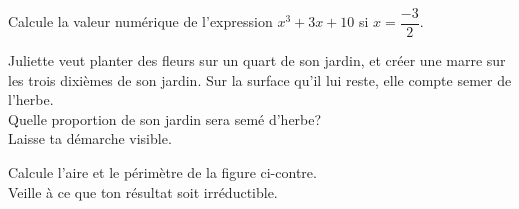 \documentclass[../math2.tex]{subfiles}
\begin{document}
\begin{exercise}
  Calcule la valeur numérique de l'expression $x^3+3x+10$ si $x=\dfrac{-3}{2}$.
\end{exercise}

\begin{exercise}
  Juliette veut planter des fleurs sur un quart de son jardin, et créer une marre sur les trois dixièmes de son jardin. Sur la surface qu'il lui reste, elle compte semer de l'herbe. \\
  Quelle proportion de son jardin sera semé d'herbe?  \\ Laisse ta démarche visible.
\end{exercise}

\begin{exercise}
  Calcule l'aire et le périmètre de la figure ci-contre. \\
  Veille à ce que ton résultat soit irréductible.
  
\begin{center}
  
\end{center}

\end{exercise}
\end{document}
